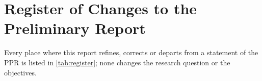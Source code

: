 
\appendix
\section{Register of Changes to the Preliminary Report}
\label{app:register}
Every place where this report refines, corrects or departs from a statement of the PPR is listed in \cref{tab:register}; none changes the research question or the objectives. 


